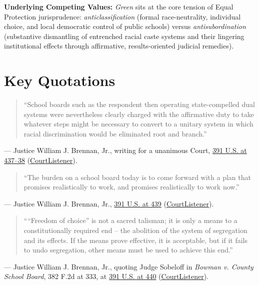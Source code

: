 \documentclass[12pt]{article}
\begin{document}
\textbf{Underlying Competing Values:} \textit{Green} sits at the core tension of Equal Protection jurisprudence: \textit{anticlassification} (formal race-neutrality, individual choice, and local democratic control of public schools) versus \textit{antisubordination} (substantive dismantling of entrenched racial caste systems and their lingering institutional effects through affirmative, results-oriented judicial remedies).

\section{Key Quotations}

\begin{quote}
``School boards such as the respondent then operating state-compelled dual systems were nevertheless clearly charged with the affirmative duty to take whatever steps might be necessary to convert to a unitary system in which racial discrimination would be eliminated root and branch.''
\end{quote}
\noindent --- Justice William J. Brennan, Jr., writing for a unanimous Court, \href{https://supreme.justia.com/cases/federal/us/391/430/}{391 U.S. at 437--38} (\href{https://www.courtlistener.com/opinion/107705/green-v-county-school-board-of-new-kent-county/}{CourtListener}).

\begin{quote}
``The burden on a school board today is to come forward with a plan that promises realistically to work, and promises realistically to work now.''
\end{quote}
\noindent --- Justice William J. Brennan, Jr., \href{https://supreme.justia.com/cases/federal/us/391/430/}{391 U.S. at 439} (\href{https://www.courtlistener.com/opinion/107705/green-v-county-school-board-of-new-kent-county/}{CourtListener}).

\begin{quote}
````Freedom of choice'' is not a sacred talisman; it is only a means to a constitutionally required end -- the abolition of the system of segregation and its effects. If the means prove effective, it is acceptable, but if it fails to undo segregation, other means must be used to achieve this end.''
\end{quote}
\noindent --- Justice William J. Brennan, Jr., quoting Judge Sobeloff in \textit{Bowman v. County School Board}, 382 F.2d at 333, at \href{https://supreme.justia.com/cases/federal/us/391/430/}{391 U.S. at 440} (\href{https://www.courtlistener.com/opinion/107705/green-v-county-school-board-of-new-kent-county/}{CourtListener}).
\end{document}
